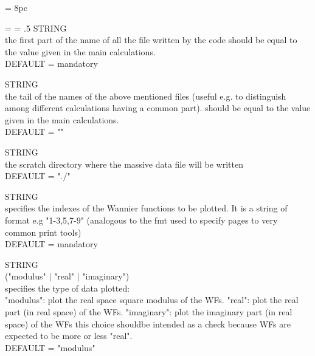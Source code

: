 \newdimen\descindent \descindent = 8pc
{\noindent \leftskip = \descindent \parskip = .5\baselineskip
{}%
STRING \\ the first part of the name of all the file written by the code
              should be equal to the value given in the main calculations.\\
              DEFAULT = mandatory \par

\noindent{}%
STRING \\ the tail of the names of the above mentioned files (useful e.g. to
              distinguish among different calculations having a common part).
              should be equal to the value given in the main calculations.\\
              DEFAULT = "" \par

\noindent{}%
STRING \\ the scratch directory where the massive data file will be written\\
              DEFAULT = "$./$" \par

\noindent{}%
STRING \\ specifies the indexes of the Wannier functions to be plotted.
              It is a string of format e.g "1-3,5,7-9" (analogous to the fmt used
              to specify pages to very common print tools)\\
              DEFAULT = mandatory \par

\noindent{}%
STRING \\ ("modulus" $\mid$ "real" $\mid$ "imaginary")\\
              specifies the type of data plotted:\\
                "modulus":    plot the real space square modulus of the WFs.
                "real":       plot the real part (in real space) of the WFs.
                "imaginary":  plot the imaginary part (in real space) of the WFs
                              this choice shouldbe intended as a check because WFs
                              are expected to be more or less "real".\\
              DEFAULT = "modulus" \par

}
